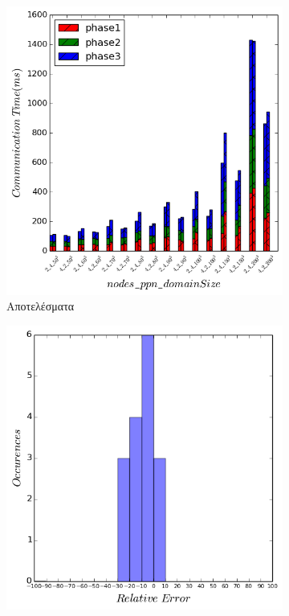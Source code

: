 \begin{figure}[H]
    \centering
    \captionsetup{justification=centering,margin=0cm,font=footnotesize}
    \begin{subfigure}[b]{0.47\textwidth}
        \includegraphics[width=\textwidth]{./images/NB+cg_mfs_NUMA/lulesh_res.png}
        \caption{Αποτελέσματα}
    \end{subfigure}
    \quad %
    \begin{subfigure}[b]{0.47\textwidth}
        \includegraphics[width=\textwidth]{./images/NB+cg_mfs_NUMA/lulesh_err_dist.png}

\end{subfigure}
\end{figure}
